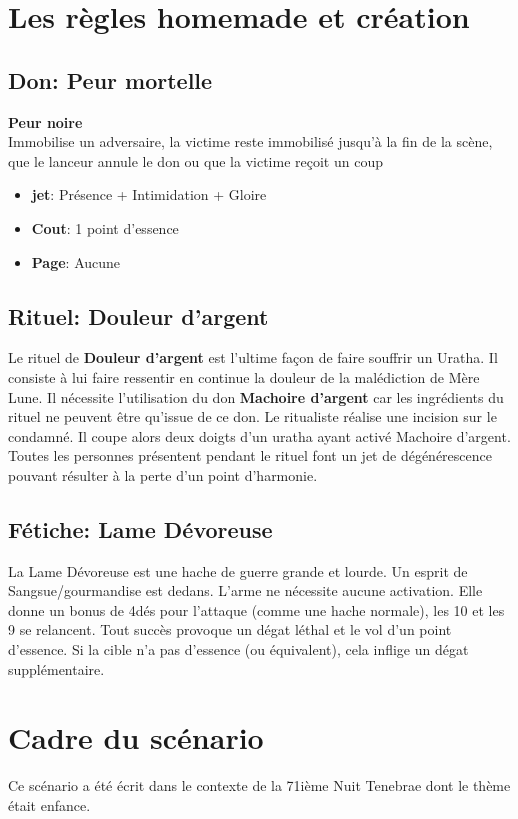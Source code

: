 \documentclass[oneside,12pt]{book}
\newcommand\don[5]{
\textbf{#1} \\
#2
\begin{itemize}
\item{ \textbf{jet}: #3}
\item{ \textbf{Cout}: #4}
\item{ \textbf{Page}: #5}
\end{itemize}
\vspace{0.5cm}
}
\begin{document}
\begin{flushleft}
\section{Les règles homemade et création}
\subsection{Don: Peur mortelle}
\label{Peur_mortelle}
\don{Peur noire}{Immobilise un adversaire, la victime reste immobilisé jusqu'à la fin de la scène, que le lanceur annule le don ou que la victime reçoit un coup}{Présence + Intimidation + Gloire}{1 point d'essence}{Aucune}
\subsection{Rituel: Douleur d'argent}
Le rituel de \textbf{Douleur d'argent} est l'ultime façon de faire souffrir un Uratha. Il consiste à lui faire ressentir en continue la douleur de la malédiction de Mère Lune.
Il nécessite l'utilisation du don \textbf{Machoire d'argent} car les ingrédients du rituel ne peuvent être qu'issue de ce don. Le ritualiste réalise une incision sur le condamné. Il coupe alors deux doigts d'un uratha ayant activé {Machoire d'argent}. Toutes les personnes présentent pendant le rituel font un jet de dégénérescence pouvant résulter à la perte d'un point d'harmonie.
\subsection{Fétiche: Lame Dévoreuse}
\label{devoreuse}
La Lame Dévoreuse est une hache de guerre grande et lourde. Un esprit de Sangsue/gourmandise est dedans. L'arme ne nécessite aucune activation. Elle donne un bonus de 4dés pour l'attaque (comme une hache normale), les 10 et les 9 se relancent. Tout succès provoque un dégat léthal et le vol d'un point d'essence. Si la cible n'a pas d'essence (ou équivalent), cela inflige un dégat supplémentaire.    

\section{Cadre du scénario}
Ce scénario a été écrit dans le contexte de la 71ième Nuit Tenebrae dont le thème était enfance. 


\end{flushleft}
\end{document}
